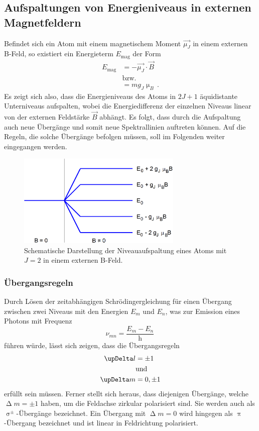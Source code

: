\subsection{Aufspaltungen von Energieniveaus in externen Magnetfeldern}
Befindet sich ein Atom mit einem magnetischem Moment $\vec{\mu_J}$ in einem externen B-Feld, so existiert ein Energieterm $E_\text{mag}$ der Form
\begin{align}
E_\text{mag}&=-\vec{\mu_J}\cdot\vec{B}\\
&\text{bzw.}\nonumber\\
&=mg_J\upmu_B\,.
\end{align}
Es zeigt sich also, dass die Energieniveaus des Atoms in $2J+1$ äquidistante Unterniveaus aufspalten, wobei die Energiedifferenz der einzelnen Niveaus linear von der externen Feldstärke $\vec{B}$ abhängt.
Es folgt, dass durch die Aufspaltung auch neue Übergänge und somit neue Spektrallinien auftreten können. Auf die Regeln, die solche Übergänge befolgen müssen, soll im Folgenden weiter eingegangen werden.
\begin{figure}
  \centering
  \includegraphics[width=0.7\textwidth]{Bilder/t1.png}
  \caption{Schematische Darstellung der Niveauaufspaltung eines Atoms mit $J=2$ in einem externen B-Feld.}
\end{figure}
\subsubsection{Übergangsregeln}
Durch Lösen der zeitabhängigen Schrödingergleichung für einen Übergang zwischen zwei Niveaus mit den Energien $E_m$ und $E_n$, was zur Emission eines Photons mit Frequenz
\begin{equation}
\nu_{mn}=\frac{E_m-E_n}{\text{h}}\,
\end{equation}
führen würde, lässt sich zeigen, dass die Übergangsregeln
\begin{align}
\upDelta l&=\pm1\newline\\
&\text{und}\nonumber\\
\upDelta m &=0,\pm1
\end{align}
erfüllt sein müssen. Ferner stellt sich heraus, dass diejenigen Übergänge, welche $\upDelta m=\pm 1$ haben, um die Feldachse zirkular polarisiert sind. Sie werden auch als $\upsigma^\pm$-Übergänge bezeichnet. Ein Übergang mit $\upDelta m=0$ wird hingegen als $\uppi$-Übergang bezeichnet und ist linear in Feldrichtung polarisiert.
